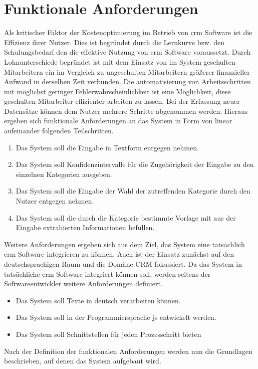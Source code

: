 \chapter{Funktionale Anforderungen}
Als kritischer Faktor der Kostenoptimierung im Betrieb von \gls{crm} Software ist die Effizienz ihrer Nutzer.
Dies ist begründet durch die Lernkurve bzw.
den Schulungsbedarf den die effektive Nutzung von \gls{crm} Software voraussetzt.
Durch Lohnunterschiede  begründet ist mit dem Einsatz von im System geschulten Mitarbeitern ein im Vergleich zu ungeschulten Mitarbeitern  größerer finanzieller Aufwand in derselben Zeit verbunden.
Die automatisierung von Arbeitsschritten mit möglichst geringer Fehlerwahrscheinlichkeit ist eine Möglichkeit, diese geschulten Mitarbeiter effizienter arbeiten zu lassen.
Bei der Erfassung neuer Datensätze können dem Nutzer mehrere Schritte abgenommen werden.
Hieraus ergeben sich funktionale Anforderungen an das System in Form von linear aufeinander folgenden Teilschritten.
\begin{enumerate}
    \item Das System soll die Eingabe in Textform entgegen nehmen.
    \item Das System soll Konfidenzintervalle für die Zugehörigkeit der Eingabe zu den einzelnen Kategorien ausgeben.
    \item Das System soll die Eingabe der Wahl der zutreffenden Kategorie durch den Nutzer entgegen nehmen.
    \item Das System soll die durch die Kategorie bestimmte Vorlage mit aus der Eingabe extrahierten Informationen befüllen.
\end{enumerate}

Weitere Anforderungen ergeben sich aus dem Ziel, das System eine tatsächlich \gls{crm} Software integrieren zu können. Auch ist der Einsatz zunächst auf den deutschsprachigen Raum und die Domäne CRM fokussiert. 
Da das System in tatsächliche \gls{crm} Software integriert können soll, werden seitens der Softwareentwickler weitere Anforderungen definiert.
\begin{itemize}
    \item Das System soll Texte in deutsch verarbeiten können.
    \item Das System soll in der Programmiersprache \gls{js} entwickelt werden.
    \item Das System soll Schnittstellen für jeden Prozesschritt bieten
\end{itemize}
Nach der Definition der funktionalen Anforderungen werden nun die Grundlagen beschrieben, auf denen das System aufgebaut wird.
